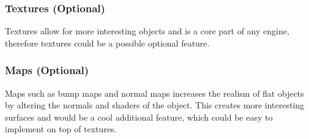 \subsubsection{Textures (Optional)}
Textures allow for more interesting objects and is a core part of any engine, therefore textures could be a possible optional feature.

\subsubsection{Maps (Optional)}
Maps such as bump maps and normal maps increases the realism of flat objects by altering the normals and shaders of the object. This creates more interesting surfaces and would be a cool additional feature, which could be easy to implement on top of textures.